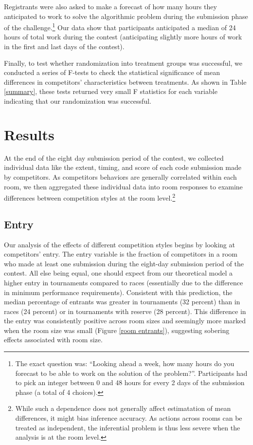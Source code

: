 \documentclass[11pt, titlepage]{article}
\begin{document}
Registrants were also asked to make a forecast of how many hours they
anticipated to work to solve the algorithmic problem during the
submission phase of the challenge.\footnote{The exact question was:
  ``Looking ahead a week, how many hours do you forecast to be able to
  work on the solution of the problem?''. Participants had to pick an
  integer between 0 and 48 hours for every 2 days of the submission
  phase (a total of 4 choices).} Our data show that participants
anticipated a median of 24 hours of total work during the contest
(anticipating slightly more hours of work in the first and last days of
the contest).

Finally, to test whether randomization into treatment groups was
successful, we conducted a series of F-tests to check the statistical
significance of mean differences in competitors' characteristics between
treatments. As shown in Table \ref{summary}, these tests returned very
small F statistics for each variable indicating that our randomization
was successful.

\section{Results}\label{results}

At the end of the eight day submission period of the contest, we
collected individual data like the extent, timing, and score of each
code submission made by competitors. As competitors behaviors are
generally correlated within each room, we then aggregated these
individual data into room responses to examine differences between
competition styles at the room level.\footnote{While such a dependence
  does not generally affect estimatation of mean differences, it might
  bias inference accuracy. As actions across rooms can be treated as
  independent, the inferential problem is thus less severe when the
  analysis is at the room level.}

\subsection{Entry}\label{entry}

Our analysis of the effects of different competition styles begins by
looking at competitors' entry. The entry variable is the fraction of
competitors in a room who made at least one submission during the
eight-day submission period of the contest. All else being equal, one
should expect from our theoretical model a higher entry in tournaments
compared to races (essentially due to the difference in minimum
performance requirements). Consistent with this prediction, the median
percentage of entrants was greater in tournaments (32 percent) than in
races (24 percent) or in tournaments with reserve (28 percent). This
difference in the entry was consistently positive across room sizes and
seemingly more marked when the room size was small (Figure
\ref{room entrants}), suggesting sobering effects associated with room
size.
\end{document}
